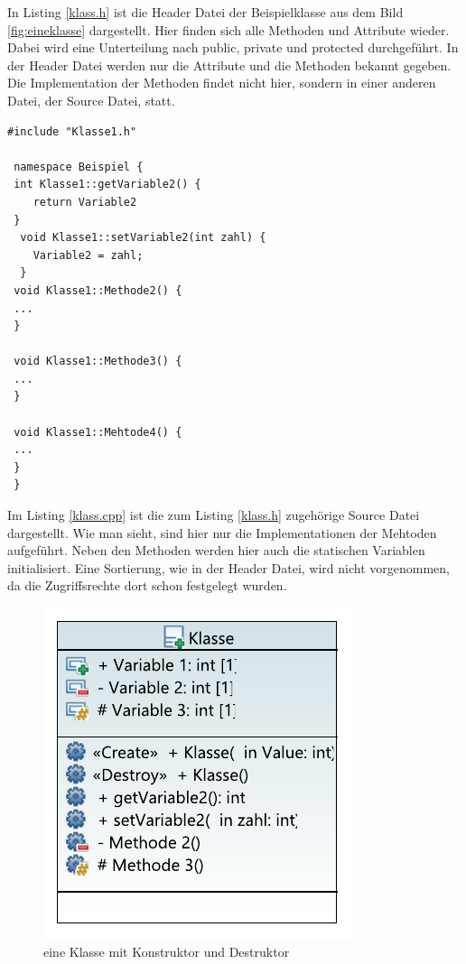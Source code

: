 In Listing \ref{klass.h} ist die Header Datei der Beispielklasse aus dem Bild \ref{fig:eineklasse} dargestellt. Hier finden sich alle Methoden und Attribute  wieder. Dabei wird eine Unterteilung nach \glqq public\grqq{},  \glqq private\grqq{} und \glqq protected\grqq{} durchgeführt. In der Header Datei werden nur die Attribute und die Methoden bekannt gegeben. Die Implementation der Methoden findet nicht hier, sondern in einer anderen Datei, der Source Datei, statt.  

 \begin{lstlisting}[caption = Klasse.cpp,label=klass.cpp]
 #include "Klasse1.h"
 
 namespace Beispiel {
 int Klasse1::getVariable2() {
 	return Variable2
 }
  void Klasse1::setVariable2(int zahl) {
  	Variable2 = zahl;
  }
 void Klasse1::Methode2() {
 ...
 }
  
 void Klasse1::Methode3() {
 ...
 }
   
 void Klasse1::Mehtode4() {
 ...
 }
 }
 \end{lstlisting}
 Im Listing \ref{klass.cpp} ist die zum Listing \ref{klass.h} zugehörige Source Datei dargestellt. Wie man sieht, sind hier nur die Implementationen der Mehtoden aufgeführt. Neben den Methoden werden hier auch die statischen Variablen initialisiert. Eine Sortierung, wie in der Header Datei, wird nicht vorgenommen, da  die Zugriffsrechte dort schon festgelegt wurden. 
  \begin{figure}[H]
  	\centering
  	\includegraphics[scale=1.2]{bilder/pdfvorlagen/test2}
  	\caption[eine Klasse mit Konstruktor und Destruktor]{eine Klasse mit Konstruktor und Destruktor}
  	\label{fig:klasseKonstr}
  \end{figure}
